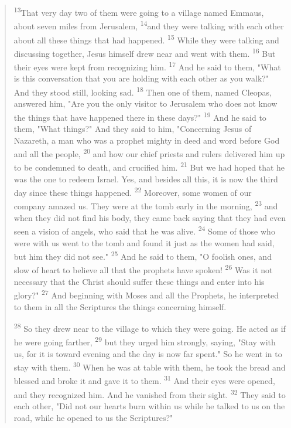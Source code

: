 \documentclass[11pt]{article} %
\begin{document}
\begin{quote}
\textsuperscript{13}That very day two of them were going to a village named Emmaus, about seven
miles from Jerusalem, \textsuperscript{14}and they were talking with each other about all these
things that had happened. \textsuperscript{15} While they were talking and discussing together,
Jesus himself drew near and went with them. \textsuperscript{16} But their eyes were kept from
recognizing him. \textsuperscript{17} And he said to them, "What is this conversation that you are
holding with each other as you walk?" And they stood still, looking sad. \textsuperscript{18} Then
one of them, named Cleopas, answered him, "Are you the only visitor to Jerusalem who does not
know the things that have happened there in these days?" \textsuperscript{19} And he said to them,
"What things?" And they said to him, "Concerning Jesus of Nazareth, a man who was a prophet
mighty in deed and word before God and all the people, \textsuperscript{20} and how our chief
priests and rulers delivered him up to be condemned to death, and crucified him.
\textsuperscript{21} But we had hoped that he was the one to redeem Israel. Yes, and besides
all this, it is now the third day since these things happened. \textsuperscript{22} Moreover, some
women of our company amazed us. They were at the tomb early in the morning,
\textsuperscript{23} and when they did not find his body, they came back saying that they had
even seen a vision of angels, who said that he was alive. \textsuperscript{24} Some of those who
were with us went to the tomb and found it just as the women had said, but him they did not see."
\textsuperscript{25} And he said to them, "O foolish ones, and slow of heart to believe all that the
prophets have spoken! \textsuperscript{26} Was it not necessary that the Christ should suffer these
things and enter into his glory?" \textsuperscript{27} And beginning with Moses and all the
Prophets, he interpreted to them in all the Scriptures the things concerning himself.

\textsuperscript{28} So they drew near to the village to which they were going. He acted as if he were
going farther, \textsuperscript{29} but they urged him strongly, saying, "Stay with us, for it is toward
evening and the day is now far spent." So he went in to stay with them. \textsuperscript{30} When he
was at table with them, he took the bread and blessed and broke it and gave it to them. 
\textsuperscript{31} And their eyes were opened, and they recognized him. And he vanished
from their sight. \textsuperscript{32} They said to each other, "Did not our hearts burn within
us while he talked to us on the road, while he opened to us the Scriptures?" 
\end{quote}
\end{document}

